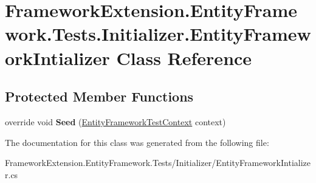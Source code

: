 \hypertarget{class_framework_extension_1_1_entity_framework_1_1_tests_1_1_initializer_1_1_entity_framework_intializer}{\section{Framework\-Extension.\-Entity\-Framework.\-Tests.\-Initializer.\-Entity\-Framework\-Intializer Class Reference}
\label{class_framework_extension_1_1_entity_framework_1_1_tests_1_1_initializer_1_1_entity_framework_intializer}
}
\subsection*{Protected Member Functions}
\begin{DoxyCompactItemize}
\item 
\hypertarget{class_framework_extension_1_1_entity_framework_1_1_tests_1_1_initializer_1_1_entity_framework_intializer_a2815f7515730e9430cb04035f3979d06}{override void {\bfseries Seed} (\hyperlink{class_framework_extension_1_1_entity_framework_1_1_tests_1_1_unit_tests_1_1_entity_framework_test_context}{Entity\-Framework\-Test\-Context} context)}\label{class_framework_extension_1_1_entity_framework_1_1_tests_1_1_initializer_1_1_entity_framework_intializer_a2815f7515730e9430cb04035f3979d06}

\end{DoxyCompactItemize}


The documentation for this class was generated from the following file\-:\begin{DoxyCompactItemize}
\item 
Framework\-Extension.\-Entity\-Framework.\-Tests/\-Initializer/Entity\-Framework\-Intializer.\-cs\end{DoxyCompactItemize}
